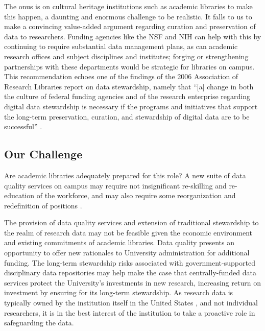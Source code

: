 \documentclass[12pt,letterpaper,titlepage,onecolumn,biblatex,backend=biber,style=chicago-authordate]{article}
\begin{document}
The onus is on cultural heritage institutions such as academic
libraries to make this happen, a daunting and enormous challenge to be
realistic. It falls to us to make a convincing value-added argument
regarding curation and preservation of data to researchers. Funding
agencies like the NSF and NIH can help with this by continuing to
require substantial data management plans, as can academic research
offices and subject disciplines and institutes; forging or
strengthening partnerships with these departments would be strategic
for libraries on campus. This recommendation echoes one of the
findings of the 2006 Association of Research Libraries report on data
stewardship, namely that ``[a] change in both the culture of federal
funding agencies and of the research enterprise regarding digital data
stewardship is necessary if the programs and initiatives that support
the long-term preservation, curation, and stewardship of digital data
are to be successful'' \autocite{arl:stewardship}.

%

\subsection{Our Challenge}

Are academic libraries adequately prepared for this role?  A new suite
of data quality services on campus may require not insignificant
re-skilling and re-education of the workforce, and may also require
some reorganization and redefinition of positions \autocite{jisc:deluge}.

The provision of data quality services and extension of traditional
stewardship to the realm of research data may not be feasible given
the economic environment and existing commitments of academic
libraries. Data quality presents an opportunity to offer new
rationales to University administration for additional funding. The
long-term stewardship risks associated with government-supported
disciplinary data repositories \autocite{baker:funding,merali:peril}
may help make the case that centrally-funded data services protect the
University's investments in new research, increasing return on
investment by ensuring for its long-term stewardship. As research data
is typically owned by the institution itself in the United
States \autocite{dhhs:tutorial,dhhs:guidelines}, and not individual
researchers, it is in the best interest of the institution to take a
proactive role in safeguarding the data.
\end{document}

